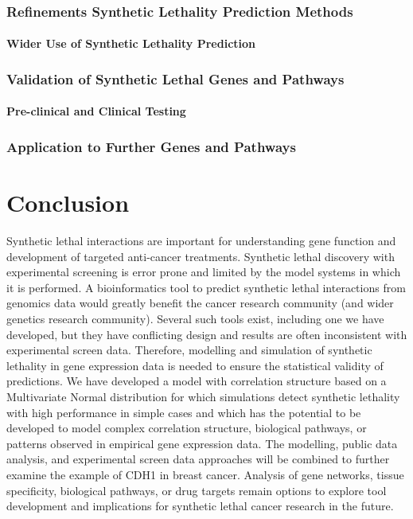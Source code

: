\subsection{Refinements Synthetic Lethality Prediction Methods}
\label{chapt6:future_slipt_method}


\subsubsection{Wider Use of Synthetic Lethality Prediction}
\label{chapt6:future_slipt_data}


\subsection{Validation of Synthetic Lethal Genes and Pathways}
\label{chapt6:future_cdh1}

\subsubsection{Pre-clinical and Clinical Testing}
\label{chapt6:future_clinic}

\subsection{Application to Further Genes and Pathways}
\label{chapt6:future_slipt}


\chapter{Conclusion}
\label{chap:conclusion}

Synthetic lethal interactions are important for understanding gene function and development of targeted anti-cancer treatments.  Synthetic lethal discovery with experimental screening is error prone and limited by the model systems in which it is performed.  A bioinformatics tool to predict synthetic lethal interactions from genomics data would greatly benefit the cancer research community (and wider genetics research community).  Several such tools exist, including one we have developed, but they have conflicting design and results are often inconsistent with experimental screen data. Therefore, modelling and simulation of synthetic lethality in gene expression data is needed to ensure the statistical validity of predictions.  We have developed a model with correlation structure based on a Multivariate Normal distribution for which simulations detect synthetic lethality with high performance in simple cases and which has the potential to be developed to model complex correlation structure, biological pathways, or patterns observed in empirical gene expression data.  The modelling, public data analysis, and experimental screen data approaches will be combined to further examine the example of CDH1 in breast cancer.  Analysis of gene networks, tissue specificity, biological pathways, or drug targets remain options to explore tool development and implications for synthetic lethal cancer research in the future. 


